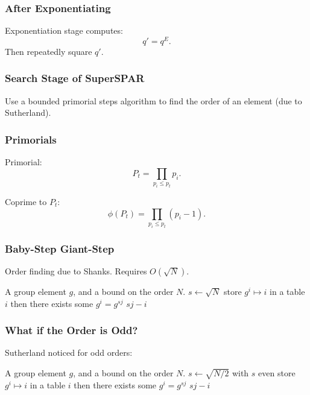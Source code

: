 \documentclass{beamer}
\begin{document}
\begin{frame}
\frametitle{After Exponentiating}
Exponentiation stage computes:
\[
	q' = q^E.
\]
Then repeatedly square $q'$.
\end{frame}



\begin{frame}
\frametitle{Search Stage of SuperSPAR}
Use a bounded primorial steps algorithm to find the order of an element (due to Sutherland).
\end{frame}

\begin{frame}
\frametitle{Primorials}
Primorial:
\[
	P_t = \prod_{p_i \le p_t} p_i.
\]

Coprime to $P_t$:
\[
	\phi(P_t) = \prod_{p_i \le p_t} (p_i - 1).
\]
\end{frame}


\begin{frame}
\frametitle{Baby-Step Giant-Step}
Order finding due to Shanks.  Requires $O(\sqrt N)$.

\bigbreak
\begin{algorithmic}[1]
\Require A group element $g$, and a bound on the order $N$.
\State $s \gets \sqrt{N}$
	\State store $g^i \mapsto i$ in a table
	 \Return $i$ \EndIf
\EndFor
{}
		\State then there exists some $g^i = g^{sj}$
		\State \Return $sj - i$
	\EndIf
\EndFor
\end{algorithmic}
\end{frame}

\begin{frame}
\frametitle{What if the Order is Odd?}
Sutherland noticed for odd orders:

\bigbreak
\begin{algorithmic}[1]
\Require A group element $g$, and a bound on the order $N$.
\State $s \gets \sqrt{N/2}$ with $s$ even
	\State store $g^i \mapsto i$ in a table
	 \Return $i$ \EndIf
\EndFor
{}
		\State then there exists some $g^i = g^{sj}$
		\State \Return $sj - i$
	\EndIf
\EndFor
\end{algorithmic}
\end{frame}
\end{document}
